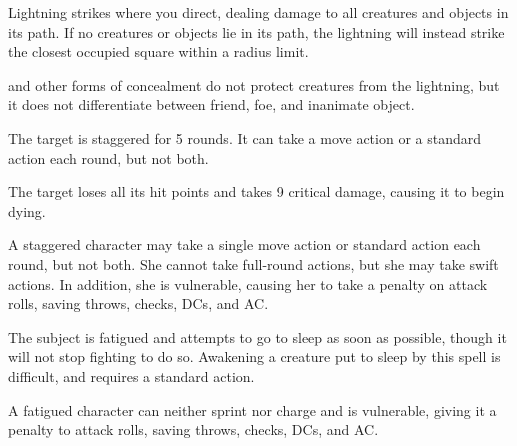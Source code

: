 \spellrng{\rngext}
\begin{spelleffect}
  Lightning strikes where you direct, dealing damage to all creatures and objects in its path. If no creatures or objects lie in its path, the lightning will instead strike the closest occupied square within a \areamed radius limit.
\end{spelleffect}
\begin{spellnotes}
  and other forms of concealment do not protect creatures from the lightning, but it does not differentiate between friend, foe, and inanimate object.
\end{spellnotes}

\begin{spellhealthy}
  The target is staggered for 5 rounds. It can take a move action or a standard action each round, but not both.
\end{spellhealthy}
\begin{spellblood}
  The target loses all its hit points and takes 9 critical damage, causing it to begin dying.
\end{spellblood}
\begin{spellnotes}
 A staggered character may take a single move action or standard action each round, but not both. She cannot take full-round actions, but she may take swift actions. In addition, she is vulnerable, causing her to take a  penalty on attack rolls, saving throws, checks, DCs, and AC.
\end{spellnotes}

\spellrng{\rngmed}
\spelldur{\durshort}
\begin{spelleffect}
  The subject is fatigued and attempts to go to sleep as soon as possible, though it will not stop fighting to do so. Awakening a creature put to sleep by this spell is difficult, and requires a standard action.
\end{spelleffect}
\begin{spellnotes}
    A fatigued character can neither sprint nor charge and is vulnerable, giving it a  penalty to attack rolls, saving throws, checks, DCs, and AC.
\end{spellnotes}

